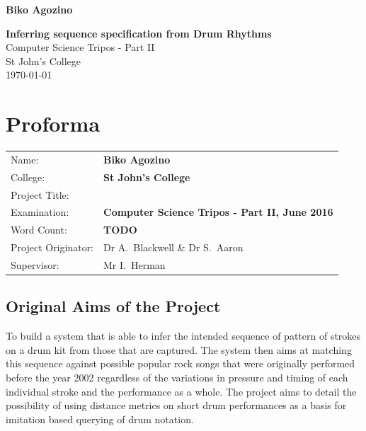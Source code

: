 \documentclass[12pt,twoside,notitlepage]{report}
\begin{document}


\pagestyle{empty}

\hfill{\LARGE \bf Biko Agozino}

\vspace*{60mm}
\begin{center}
\Huge
{\bf Inferring sequence specification from Drum Rhythms} \\
\vspace*{5mm}
Computer Science Tripos - Part II \\
\vspace*{5mm}
St John's College \\
\vspace*{5mm}
\today  %
\end{center}

\cleardoublepage


\setcounter{page}{1}
\pagestyle{plain}

\chapter*{Proforma}

{\large
\begin{tabular}{ll}
Name:               & \bf Biko Agozino                       \\
College:            & \bf St John's College                     \\
Project Title:      & \bf  \\
Examination:        & \bf Computer Science Tripos - Part II, June 2016       \\
Word Count:         & \bf TODO \\
Project Originator: & Dr A.~Blackwell \& Dr S.~Aaron                \\
Supervisor:         & Mr I.~Herman                    \\ 
\end{tabular}
}



\section*{Original Aims of the Project}

To build a system that is able to infer the intended sequence of
pattern of strokes on a drum kit from those that are captured. The system then aims at matching this sequence against possible popular rock songs that were originally performed before the year 2002 regardless of the variations in pressure and timing of each individual stroke and the performance as a whole. The project aims to detail the possibility of using distance metrics on short drum performances as a basis for imitation based querying of drum notation.
\end{document}
